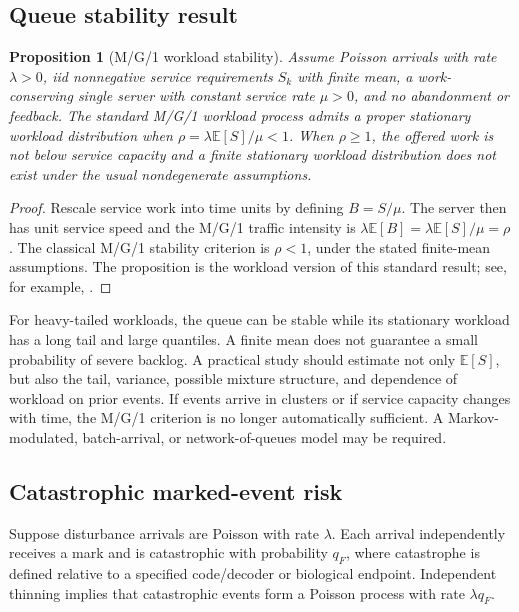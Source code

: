 \documentclass[11pt,a4paper,oneside]{article}
\newtheorem{proposition}{Proposition}[section]
\newcommand{\E}{\mathbb{E}}\newcommand{\Pp}{\mathbb{P}}\newcommand{\R}{\mathbb{R}}\newcommand{\N}{\mathbb{N}}\newcommand{\cX}{\mathcal{X}}\newcommand{\cE}{\mathcal{E}}\newcommand{\cF}{\mathcal{F}}\newcommand{\cS}{\mathcal{S}}\newcommand{\cD}{\mathcal{D}}\newcommand{\cR}{\mathcal{R}}\newcommand{\cC}{\mathcal{C}}\newcommand{\cL}{\mathcal{L}}\newcommand{\cN}{\mathcal{N}}\newcommand{\dd}{\,\mathrm{d}}\newcommand{\Prob}{\mathrm{Pr}}\newcommand{\Var}{\mathrm{Var}}\newcommand{\Cov}{\mathrm{Cov}}\newcommand{\diag}{\mathrm{diag}}\newcommand{\tr}{\mathrm{tr}}\newcommand{\argmin}{\operatorname*{arg\,min}}\newcommand{\argmax}{\operatorname*{arg\,max}}
\begin{document}
\subsection{Queue stability result}
\begin{proposition}[M/G/1 workload stability]\label{prop:queue}
Assume Poisson arrivals with rate \(\lambda>0\), iid nonnegative service requirements \(S_k\) with finite mean, a work-conserving single server with constant service rate \(\mu>0\), and no abandonment or feedback. The standard M/G/1 workload process admits a proper stationary workload distribution when \(\rho=\lambda\E[S]/\mu<1\). When \(\rho\ge1\), the offered work is not below service capacity and a finite stationary workload distribution does not exist under the usual nondegenerate assumptions.
\end{proposition}
\begin{proof}
Rescale service work into time units by defining \(B=S/\mu\). The server then has unit service speed and the M/G/1 traffic intensity is \(\lambda\E[B]=\lambda\E[S]/\mu=\rho\). The classical M/G/1 stability criterion is \(\rho<1\), under the stated finite-mean assumptions. The proposition is the workload version of this standard result; see, for example, \citet{GrossHarris1998}.\end{proof}

For heavy-tailed workloads, the queue can be stable while its stationary workload has a long tail and large quantiles. A finite mean does not guarantee a small probability of severe backlog. A practical study should estimate not only \(\E[S]\), but also the tail, variance, possible mixture structure, and dependence of workload on prior events. If events arrive in clusters or if service capacity changes with time, the M/G/1 criterion is no longer automatically sufficient. A Markov-modulated, batch-arrival, or network-of-queues model may be required.

\subsection{Catastrophic marked-event risk}
Suppose disturbance arrivals are Poisson with rate \(\lambda\). Each arrival independently receives a mark and is catastrophic with probability \(q_F\), where catastrophe is defined relative to a specified code/decoder or biological endpoint. Independent thinning implies that catastrophic events form a Poisson process with rate \(\lambda q_F\).
\end{document}
